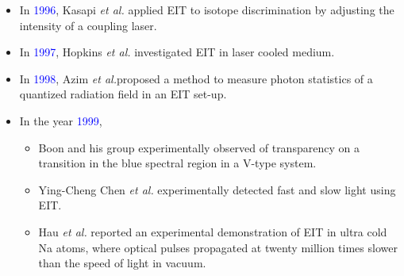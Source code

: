\documentclass[9pt,aspectratio94]{beamer}
\begin{document}
      \begin{frame}
      \begin{itemize}
          \item  In \textcolor{blue}{1996}, Kasapi \textit{et al.} applied EIT to isotope discrimination by adjusting the intensity of a coupling laser.
          \item In \textcolor{blue}{1997}, Hopkins \textit{et al.} investigated EIT in laser cooled medium.
      \item In \textcolor{blue}{1998}, Azim \textit{et al.}proposed a method to measure photon statistics of a quantized radiation field in an EIT set-up.
     \item In the year \textcolor{blue}{1999}, 
     \begin{itemize}
         \item Boon and his group experimentally observed of transparency on a transition in the blue spectral region in a V-type system.
         \item Ying-Cheng Chen \textit{et al.} experimentally detected fast and slow light using EIT.
         \item Hau \textit{et al.} reported an experimental demonstration of EIT in ultra cold Na atoms, where optical pulses propagated at twenty million times slower than the speed of light in vacuum.
         \end{itemize}
      \end{itemize}

    \end{frame}
\end{document}
